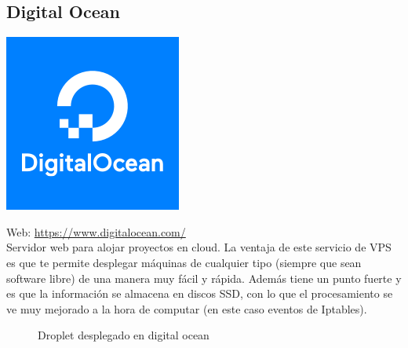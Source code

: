 \subsection{Digital Ocean}

\begin{center}\includegraphics[scale=0.35]{imagenes/docean-logo.png}\end{center}

Web: \url{https://www.digitalocean.com/}\\

Servidor web para alojar proyectos en cloud. La ventaja de este servicio de VPS es que te permite desplegar máquinas de cualquier tipo (siempre que sean software libre) de una manera muy fácil y rápida. Además tiene un punto fuerte y es que la información se almacena en discos SSD, con lo que el procesamiento se ve muy mejorado a la hora de computar (en este caso eventos de Iptables).\\

\begin{figure}[H]
\caption{Droplet desplegado en digital ocean}
\end{figure}


